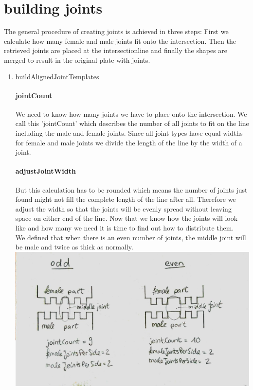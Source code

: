 \documentclass[../ClassicThesis.tex]{subfiles}
\begin{document}
\section{building joints}
The general procedure of creating joints is achieved in three steps: First we calculate how many female and male joints fit onto the intersection. Then the retrieved joints are placed at the intersectionline and finally the shapes are merged to result in the original plate with joints.
\begin{enumerate}
    \item buildAlignedJointTemplates\\
        \paragraph{jointCount}
        We need to know how many joints we have to place onto the intersection. We call this 'jointCount' which describes the number of all joints to fit on the line including the male and female joints. Since all joint types have equal widths for female and male joints we divide the length of the line by the width of a joint.
        \paragraph{adjustJointWidth}
        But this calculation has to be rounded which means the number of joints just found might not fill the complete length of the line after all. Therefore we adjust the width so that the joints will be evenly spread without leaving space on either end of the line.
        Now that we know how the joints will look like and how many we need it is time to find out how to distribute them.\\
        We defined that when there is an even number of joints, the middle joint will be male and twice as thick as normally.\\
        \includegraphics[width=\columnwidth]{Images/10-joints-evenOddJointCount.jpg}

\end{enumerate}
\end{document}
